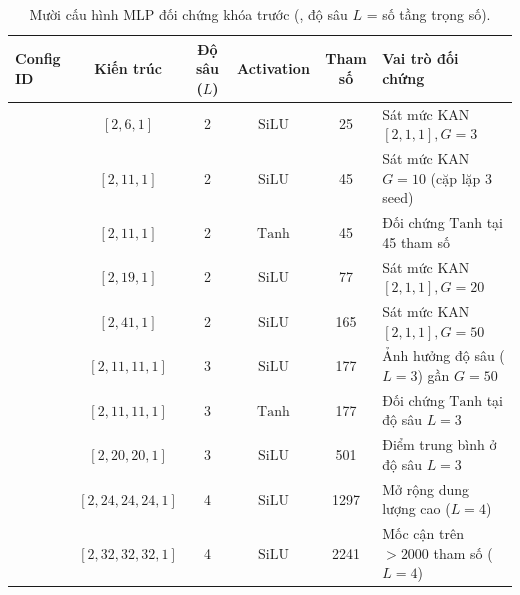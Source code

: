 \begin{table}[htbp]\centering\small
\caption{Mười cấu hình MLP đối chứng khóa trước (, độ sâu $L$ = số tầng trọng số).}\label{tab:mlp-configs-locked}
\begin{tabularx}{\linewidth}{@{}lccccY@{}}\toprule
\textbf{Config ID} & \textbf{Kiến trúc} & \textbf{Độ sâu ($L$)} & \textbf{Activation} & \textbf{Tham số} & \textbf{Vai trò đối chứng}\\\midrule
{}       & $[2, 6, 1]$          & 2 & $\mathrm{SiLU}$ & 25   & Sát mức KAN $[2,1,1], G=3$\\
      & $[2, 11, 1]$         & 2 & $\mathrm{SiLU}$ & 45   & Sát mức KAN $G=10$ (cặp lặp 3 seed)\\
 & $[2, 11, 1]$         & 2 & $\mathrm{Tanh}$ & 45   & Đối chứng $\mathrm{Tanh}$ tại 45 tham số\\
      & $[2, 19, 1]$         & 2 & $\mathrm{SiLU}$ & 77   & Sát mức KAN $[2,1,1], G=20$\\
      & $[2, 41, 1]$         & 2 & $\mathrm{SiLU}$ & 165  & Sát mức KAN $[2,1,1], G=50$\\
      & $[2, 11, 11, 1]$     & 3 & $\mathrm{SiLU}$ & 177  & Ảnh hưởng độ sâu ($L=3$) gần $G=50$\\
 & $[2, 11, 11, 1]$     & 3 & $\mathrm{Tanh}$ & 177  & Đối chứng $\mathrm{Tanh}$ tại độ sâu $L=3$\\
      & $[2, 20, 20, 1]$     & 3 & $\mathrm{SiLU}$ & 501  & Điểm trung bình ở độ sâu $L=3$\\
      & $[2, 24, 24, 24, 1]$ & 4 & $\mathrm{SiLU}$ & 1297 & Mở rộng dung lượng cao ($L=4$)\\
      & $[2, 32, 32, 32, 1]$ & 4 & $\mathrm{SiLU}$ & 2241 & Mốc cận trên $>2000$ tham số ($L=4$)\\\bottomrule
\end{tabularx}\end{table}

